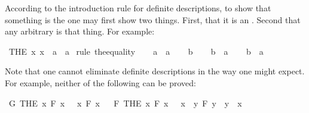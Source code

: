 \begin{isabellebody}
\begin{isamarkuptext}
According to the introduction rule for definite descriptions, to show that something is
the  one may first show two things. First, that it is an . Second that any
arbitrary  is that thing. For example:%
\end{isamarkuptext}\isamarkuptrue%
\isamarkupfalse%
\ {\isachardoublequoteopen}{\isacharparenleft}THE\ x{\isachardot}\ x\ {\isacharequal}\ a{\isacharparenright}\ {\isacharequal}\ a{\isachardoublequoteclose}\isanewline
%
\isadelimproof
%
\endisadelimproof
%
\isatagproof
{}\isamarkupfalse%
\ {\isacharparenleft}rule\ the{\isacharunderscore}equality{\isacharparenright}\isanewline
\ \ \isamarkupfalse%
\ {\isachardoublequoteopen}a\ {\isacharequal}\ a{\isachardoublequoteclose}\isacommand{{\isachardot}{\isachardot}}\isamarkupfalse%
\isanewline
{}\isamarkupfalse%
\isanewline
\ \ \isamarkupfalse%
\ b\isanewline
\ \ \isamarkupfalse%
\ {\isachardoublequoteopen}b\ {\isacharequal}\ a{\isachardoublequoteclose}\isanewline
\ \ \isamarkupfalse%
\ {\isachardoublequoteopen}b\ {\isacharequal}\ a{\isachardoublequoteclose}\isacommand{{\isachardot}}\isamarkupfalse%
\isanewline
{}\isamarkupfalse%
%
\endisatagproof
{\isafoldproof}%
%
\isadelimproof
%
\endisadelimproof
%
\begin{isamarkuptext}%
Note that one cannot eliminate definite descriptions in the way one might expect. For example,
neither of the following can be proved:%
\end{isamarkuptext}\isamarkuptrue%
\isamarkupfalse%
\ {\isachardoublequoteopen}G\ {\isacharparenleft}THE\ x{\isachardot}\ F\ x{\isacharparenright}\ {\isasymlongrightarrow}\ {\isacharparenleft}{\isasymexists}\ x{\isachardot}\ F\ x{\isacharparenright}{\isachardoublequoteclose}%
\isadelimproof
\ %
\endisadelimproof
%
\isatagproof
{}\isamarkupfalse%
%
\endisatagproof
{\isafoldproof}%
%
\isadelimproof
%
\endisadelimproof
\isanewline
{}\isamarkupfalse%
\ {\isachardoublequoteopen}F\ {\isacharparenleft}THE\ x{\isachardot}\ F\ x{\isacharparenright}\ {\isasymlongrightarrow}\ {\isacharparenleft}{\isasymexists}\ x{\isachardot}\ {\isasymforall}\ y{\isachardot}\ F\ y\ {\isasymlongrightarrow}\ y\ {\isacharequal}\ x{\isacharparenright}{\isachardoublequoteclose}%
\isadelimproof
\ %
\endisadelimproof
%
\isatagproof
{}\isamarkupfalse%
%
\endisatagproof
{\isafoldproof}%
%
\isadelimproof
%
\endisadelimproof
%
\begin{isamarkuptext}%

\end{isamarkuptext}
\end{isabellebody}
